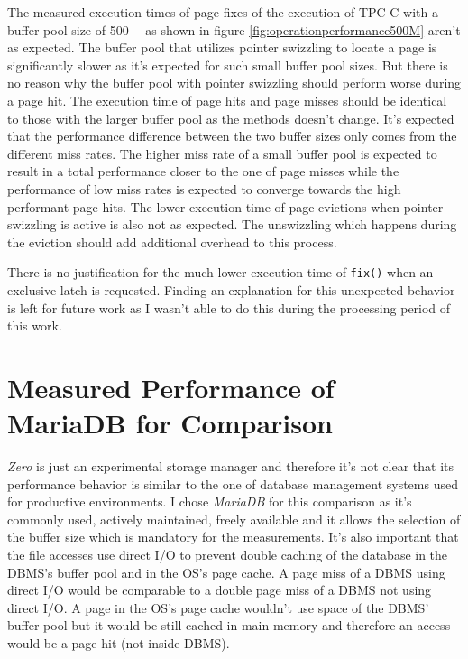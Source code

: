	The measured execution times of page fixes of the execution of TPC-C with a buffer pool size of \SI{500}{\mebi\byte} as shown in figure \ref{fig:operationperformance500M} aren't as expected. The buffer pool that utilizes pointer swizzling to locate a page is significantly slower as it's expected for such small buffer pool sizes. But there is no reason why the buffer pool with pointer swizzling should perform worse during a page hit. The execution time of page hits and page misses should be identical to those with the larger buffer pool as the methods doesn't change. It's expected that the performance difference between the two buffer sizes only comes from the different miss rates. The higher miss rate of a small buffer pool is expected to result in a total performance closer to the one of page misses while the performance of low miss rates is expected to converge towards the high performant page hits. The lower execution time of page evictions when pointer swizzling is active is also not as expected. The unswizzling which happens during the eviction should add additional overhead to this process.
	
	There is no justification for the much lower execution time of \lstinline{fix()} when an exclusive latch is requested. Finding an explanation for this unexpected behavior is left for future work as I wasn't able to do this during the processing period of this work.

\section{Measured Performance of MariaDB for Comparison}

	\emph{Zero} is just an experimental storage manager and therefore it's not clear that its performance behavior is similar to the one of database management systems used for productive environments. I chose \emph{MariaDB} for this comparison as it's commonly used, actively maintained, freely available and it allows the selection of the buffer size which is mandatory for the measurements. It's also important that the file accesses use direct I/O to prevent double caching of the database in the DBMS's buffer pool and in the OS's page cache. A page miss of a DBMS using direct I/O would be comparable to a double page miss of a DBMS not using direct I/O. A page in the OS's page cache wouldn't use space of the DBMS' buffer pool but it would be still cached in main memory and therefore an access would be a page hit (not inside DBMS).
	
